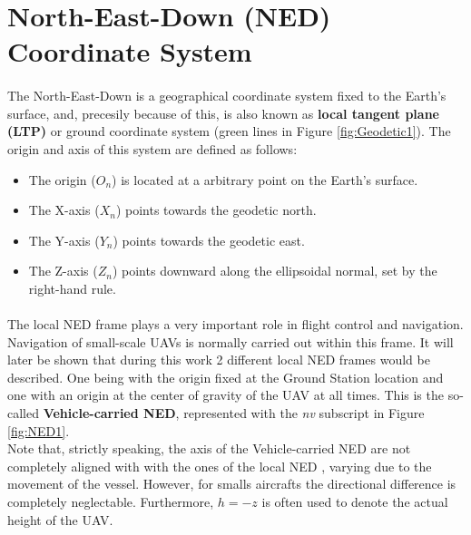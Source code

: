 \section{North-East-Down (NED) Coordinate System}\label{sec:ned}

\paragraph{} The North-East-Down is a geographical coordinate system fixed to the Earth's surface, and, precesily because of this, is also known as \textbf{local tangent plane (LTP)} or ground coordinate system (green lines in Figure \ref{fig:Geodetic1}). The origin and axis of this system are defined as follows: 
\begin{itemize}
\item{The origin (\textbf{$O_{n}$}) is located at a arbitrary point on the Earth's surface.}
\item{The X-axis (\textbf{$X_{n}$}) points towards the geodetic north.}
\item{The Y-axis (\textbf{$Y_{n}$}) points towards the geodetic east.}
\item{The Z-axis (\textbf{$Z_{n}$}) points downward along the ellipsoidal normal, set by the right-hand rule.}
\end{itemize}

\paragraph{} The local NED frame plays a very important role in flight control and navigation.
Navigation of small-scale UAVs is normally carried out within this frame. It will later be shown that during this work 2 different local NED frames would be described. One being with the origin fixed at the Ground Station location and one with an origin at the center of gravity of the UAV at all times. This is the so-called \textbf{Vehicle-carried NED}, represented with the \textit{nv} subscript in Figure \ref{fig:NED1}.\\
Note that, strictly speaking, the axis of the Vehicle-carried NED are not completely aligned with with the ones of the local NED , varying due to the movement of the vessel. However, for smalls aircrafts the directional difference is completely neglectable. Furthermore, $h = -z$ is often used to denote the actual height of the UAV.

